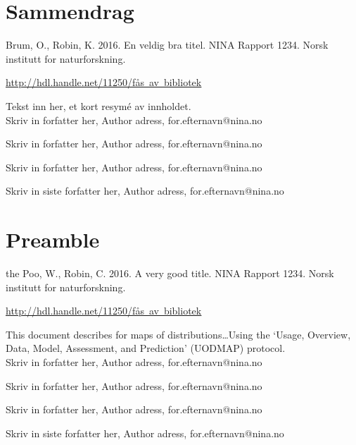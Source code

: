 \documentclass[11pt, a4paper]{article}
\renewcommand*{\href}[2]{\hyperref[#1]{\color{darkblue}\setulcolor{darkblue}\ul{\mbox{#2}}}}
\begin{document}
\clearpage
\setcounter{secnumdepth}{0}
\section{Sammendrag}
\normalsize{Brum, O., Robin, K. 2016. En veldig bra
titel.} NINA Rapport 1234. Norsk institutt for naturforskning. \par\href{http://hdl.handle.net/11250/fås
av bibliotek}{http://hdl.handle.net/11250/fås av bibliotek} \par
\vspace{0.5cm}
\normalsize{
Tekst inn her, et kort resymé av innholdet.} \\

\vspace{1cm}
\small
Skriv in forfatter her, Author adress, for.efternavn@nina.no  \par
Skriv in forfatter her, Author adress, for.efternavn@nina.no  \par
Skriv in forfatter her, Author adress, for.efternavn@nina.no  \par
Skriv in siste forfatter her, Author adress, for.efternavn@nina.no  \par
\normalsize
\clearpage

\setcounter{secnumdepth}{0}
\section{Preamble}
\small{the Poo, W., Robin, C. 2016. A very good
title.} NINA Rapport 1234. Norsk institutt for naturforskning. \par\href{http://hdl.handle.net/11250/fås
av bibliotek}{http://hdl.handle.net/11250/fås av bibliotek}\par
\vspace{0.5cm}
\normalsize{
This document describes for maps of distributions\ldots Using the
`Usage, Overview, Data, Model, Assessment, and Prediction' (UODMAP)
protocol.} \\

\vspace{1cm}
\small
Skriv in forfatter her, Author adress, for.efternavn@nina.no  \par
Skriv in forfatter her, Author adress, for.efternavn@nina.no  \par
Skriv in forfatter her, Author adress, for.efternavn@nina.no  \par
Skriv in siste forfatter her, Author adress, for.efternavn@nina.no  \par
\normalsize
\clearpage
\end{document}
